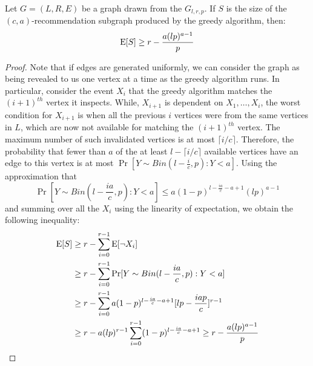 \begin{thm}
Let $G=(L,R,E)$ be a graph drawn from the $G_{l,r,p}$. If $S$ is the size of the $(c,a)$-recommendation subgraph produced by the greedy algorithm, then:
\[ \text{E}[S] \geq r - \frac{a(lp)^{a-1}}{p}\]
\end{thm}
\begin{proof}
Note that if edges are generated uniformly, we can consider the
graph as being revealed to us one vertex at a time as the greedy
algorithm runs. In particular, consider the event $X_i$ that the
greedy algorithm matches the $(i+1)^{th}$ vertex it inspects. While,
$X_{i+1}$ is dependent on $X_1,\ldots, X_i$, the worst condition for
$X_{i+1}$ is when all the previous $i$ vertices were from the same
vertices in $L$, which are now not available for matching the
$(i+1)^{th}$ vertex. The maximum number of such invalidated vertices
is at most $\lceil i/c \rceil$. Therefore, the probability that fewer
than $a$ of the at least $l-\lceil i/c \rceil $ available 
vertices have an edge to this vertex is at most $\Pr[Y\sim Bin(l-\frac{i}{c},p): Y < a]$.
Using the approximation that
\[ \Pr[Y\sim Bin(l-\frac{ia}{c},p): Y < a] \leq a(1-p)^{l-\frac{ia}{c}-a+1}(lp)^{a-1}\]
and summing over all the $X_i$ using the linearity of expectation,
we obtain the following inequality:
\begin{align*}
      \text{E}[S]
&\geq r - \sum_{i=0}^{r-1} \text{E}[\lnot X_i] \\
&\geq r - \sum_{i=0}^{r-1} \Pr[Y \sim Bin(l-\frac{ia}{c},p): Y < a] \\
&\geq r - \sum_{i=0}^{r-1}a(1-p)^{l-\frac{ia}{c}-a+1}[lp-\frac{iap}{c}]^{r-1} \\
&\geq r - a(lp)^{r-1}\sum_{i=0}^{r-1}(1-p)^{l-\frac{ia}{c}-a+1} \geq r - \frac{a(lp)^{a-1}}{p}\\
\end{align*}
\end{proof} 
